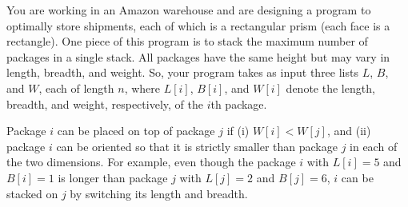 \documentclass[11pt]{article}
\theoremstyle{definition}
\theoremstyle{theorem}
\begin{document}
You are working in an Amazon warehouse and are designing a program to
optimally store shipments, each of which is a rectangular prism (each
face is a rectangle).  One piece of this program is to stack the
maximum number of packages in a single stack.  All packages have the
same height but may vary in length, breadth, and weight.  So, your
program takes as input three lists $L$, $B$, and $W$, each of length
$n$, where $L[i]$, $B[i]$, and $W[i]$ denote the length, breadth, and
weight, respectively, of the $i$th package.

Package $i$ can be placed on top of package $j$ if (i) $W[i] <
W[j]$, and (ii) package $i$ can be oriented so that it is strictly
smaller than package $j$ in each of the two dimensions.  For example,
even though the package $i$ with $L[i] = 5$ and $B[i] = 1$ is longer
than package $j$ with $L[j] = 2$ and $B[j] = 6$, $i$ can be stacked on
$j$ by switching its length and breadth.
\end{document}
